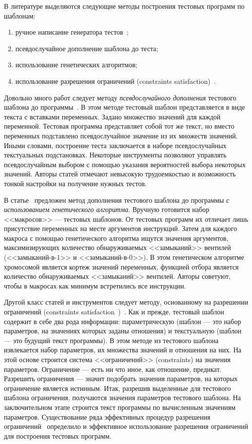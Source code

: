 \documentclass[14pt]{extreport}
\begin{document}
В литературе выделяются следующие методы построения тестовых программ по шаблонам:
\begin{enumerate}
	\item ручное написание генератора тестов~\cite{MicroTESK};
	\item псевдослучайное дополнение шаблона до теста;
	\item использование генетических алгоритмов;
	\item использование разрешения ограничений (constraints satisfaction)~\cite{CLP}.
\end{enumerate}

Довольно много работ следует методу \emph{псевдослучайного дополнения} тестового шаблона до программы~\cite{SEGUE1, SEGUE2, PA-RISC, TSE, Theo, mVpGen}. В этом методе тестовый шаблон представляется в виде текста с вставками переменных. Задано множество значений для каждой переменной. Тестовая программа представляет собой тот же текст, но вместо переменных подставлено псевдослучайное значение из их множеств значений. Иными словами, построение теста заключается в наборе псевдослучайных текстуальных подстановках. Некоторые инструменты позволяют управлять псевдослучайным выбором с помощью указания вероятностей выбора некоторых значений. Авторы статей отмечают невысокую трудоемкостью и возможность тонкой настройки на получение нужных тестов.

В статье~\cite{GeneticTemplates} предложен метод дополнения тестового шаблона до программы \emph{с использованием генетического алгоритма}. Вручную готовится набор <<макросов>> --- тестовых шаблонов. От тестовых программ их отличает лишь присутствие переменных на месте аргументов инструкций. Затем для каждого макроса с помощью генетического алгоритма ищутся значения аргументов, максимизирующих количество обнаруживаемых <<замыканий>> вентилей (<<замыканий-в-1>> и <<замыканий-в-0>>). В этом генетическом алгоритме хромосомой является кортеж значений переменных, функцией отбора является количество обнаруживаемых <<замыканий>> вентилей. Авторы советуют, чтобы в макросах как минимум встретились все инструкции.

Другой класс статей и инструментов следует методу, основанному на разрешении ограничений (constraints satisfaction~\cite{CLP})~\cite{GenesysPro, GenesysPro2004Innovations, DeepTrans, RAVEN, MAATG}. Как и прежде, тестовый шаблон содержит в себе два рода информации: параметрическую (шаблон --- это набор параметров, на значениях которых заданы отношения) и текстуальную (шаблон --- это будущий текст программы). В этом методе из тестового шаблона извлекается набор параметров, их множества значений и отношения на них. На этой основе строится система <<ограничений>> (constraints) на значения параметров. Ограничение --- есть ни что иное, как отношение, предикат. Разрешить ограничения --- значит подобрать значения параметров, на которых ограничение является истинным. Итак, разрешив выделенные для тестового шаблона ограничения, получаются значения параметров тестового шаблона. На заключительном этапе строится текст программы по вычисленным значениям параметров. Существование ряда эффективных процедур разрешения ограничений~\cite{CLP, SMT} определило и эффективное использование разрешения ограничений для построения тестовых программ.
\end{document}
